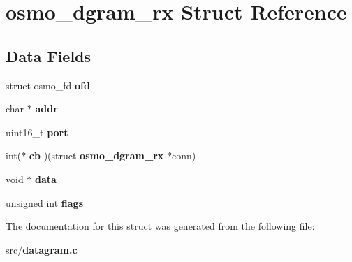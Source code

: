 \section{osmo\+\_\+dgram\+\_\+rx Struct Reference}
\label{structosmo__dgram__rx}
\subsection*{Data Fields}
\begin{DoxyCompactItemize}
\item 
struct osmo\+\_\+fd {\bfseries ofd}\label{structosmo__dgram__rx_a544bbbb72a4045a1f2825dbad7d40868}

\item 
char $\ast$ {\bfseries addr}\label{structosmo__dgram__rx_a535d49708ee6b7f249ca58082b2bb8c4}

\item 
uint16\+\_\+t {\bfseries port}\label{structosmo__dgram__rx_ad1d56701eaf83e6f866bbfdf00d178fa}

\item 
int($\ast$ {\bfseries cb} )(struct {\bf osmo\+\_\+dgram\+\_\+rx} $\ast$conn)\label{structosmo__dgram__rx_a4810048d7287542504c7292aa3bd995d}

\item 
void $\ast$ {\bfseries data}\label{structosmo__dgram__rx_a729c167ee1930b83777aa5f480eb8204}

\item 
unsigned int {\bfseries flags}\label{structosmo__dgram__rx_a473bbab3a801abe77374f6346a8aaafb}

\end{DoxyCompactItemize}


The documentation for this struct was generated from the following file\+:\begin{DoxyCompactItemize}
\item 
src/{\bf datagram.\+c}\end{DoxyCompactItemize}
